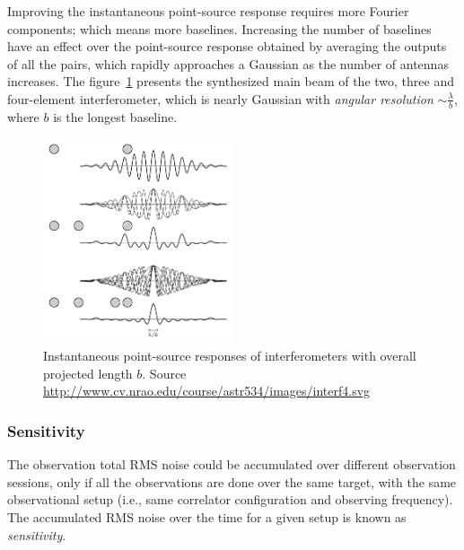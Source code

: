 Improving the instantaneous point-source response requires more Fourier components; which means more baselines. Increasing the number of baselines have an effect over the point-source response obtained by averaging the outputs of all the pairs, which rapidly approaches a Gaussian as the number of antennas increases. The figure~\ref{fig:interf-components} presents the synthesized main beam of the two, three and four-element interferometer, which is nearly Gaussian with \textit{angular resolution} $\sim \frac{\lambda}{b}$, where $b$ is the longest baseline.  
\begin{figure}[htbp]
\centering
\includegraphics[width=0.5\textwidth]{images/interf4}
\caption[Instantaneous point-source responses of interferometers with overall projected length $b$]{Instantaneous point-source responses of interferometers with overall projected length $b$. Source \url{http://www.cv.nrao.edu/course/astr534/images/interf4.svg}}
\label{fig:interf-components}
\end{figure}

\subsubsection{Sensitivity}
\label{sec:sens}
The observation total RMS noise could be accumulated over different observation sessions, only if all the observations are done over the same target, with the same observational setup (i.e., same correlator configuration and observing frequency). The accumulated RMS noise over the time for a given setup is known as \textit{sensitivity}.

